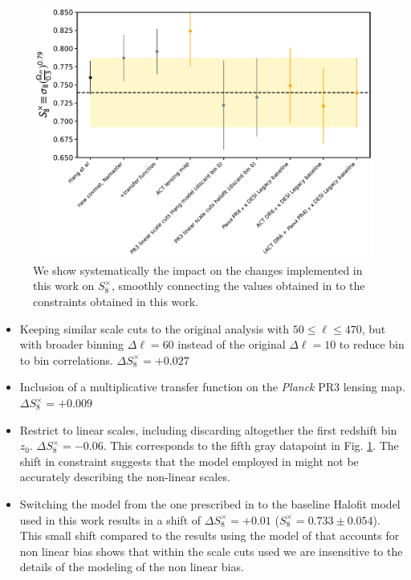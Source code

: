 \documentclass[twocolumn]{aastex631}
\begin{document}
{\begin{figure}
    \centering
    \includegraphics[width=\linewidth]{figures/evolution.pdf}
    \caption{
    We show systematically the impact on the changes implemented in this work on $S^\times_8$, smoothly connecting the values obtained in \citep{hang2021} to the constraints obtained in this work.} \label{fig.s8evol}
\end{figure}

\begin{itemize}
    \item Keeping similar scale cuts to the original analysis with $50\leq\ell\leq470$, but with broader binning $\Delta\ell=60$ instead of the original $\Delta\ell=10$ to reduce bin to bin correlations. $\Delta{S^{\times}_8}=+0.027$
    \item Inclusion of a multiplicative transfer function on the \textit{Planck} PR3 lensing map. $\Delta{S^{\times}_8}=+0.009$
    \item Restrict to linear scales, including discarding altogether the first redshift bin $z_0$. $\Delta{S^{\times}_8}=-0.06$. This corresponds to the fifth gray datapoint in Fig. \ref{fig.s8evol}. The shift in constraint suggests that the model employed in \citep{hang2021} might not be accurately describing the non-linear scales.
    \item Switching the model from the one prescribed in \citep{hang2021} to the baseline  Halofit model used in this work results in a shift of $\Delta{S^{\times}_8}=+0.01$ ($S^{\times}_8=0.733\pm0.054$). This small shift compared to the results using the model of \citep{hang2021} that accounts for non linear bias shows that within the scale cuts used we are insensitive to the details of the modeling of the non linear bias.
\end{itemize}


}
\end{document}
